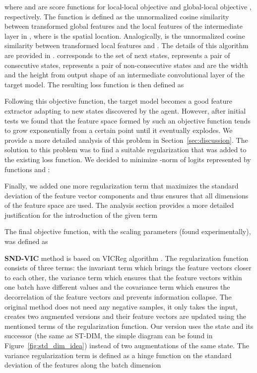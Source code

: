 \documentclass[a4paper,11pt]{elsarticle}
\begin{document}
where  and 
are score functions for local-local objective  and global-local objective , respectively. 
The function  is defined as the unnormalized cosine similarity between transformed global features  and the local features  of the intermediate layer  in , where  is the spatial location. Analogically,  is the unnormalized cosine similarity between transformed local features  and . The details of this algorithm are provided in \cite{Anand2019}.  corresponds to the set of next states,  represents a pair of consecutive states,  represents a pair of non-consecutive states and  are the width and the height from output shape of an intermediate convolutional layer of the target model.
The resulting loss function is then defined as

Following this objective function, the target model becomes a good feature extractor adapting to new states discovered by the agent. However, after initial tests we found that the feature space formed by such an objective function tends to grow exponentially from a certain point until it eventually explodes. We provide a more detailed analysis of this problem in Section~\ref{sec:discussion}. The solution to this problem was to find a suitable regularization that was added to the existing loss function. We decided to minimize -norm of logits represented by functions  and :

Finally, we added one more regularization term  that maximizes the standard deviation  of the feature vector components and thus ensures that all dimensions of the feature space are used. The analysis section provides a more detailed justification for the introduction of the given term


The final objective function, with the scaling parameters  (found experimentally), was defined as


\textbf{SND-VIC} method is based on VICReg algorithm \citep{Bardes2022}. The regularization function consists of three terms: the invariant term which brings the feature vectors closer to each other, the variance term which ensures that the feature vectors within one batch have different values and the covariance term which ensures the decorrelation of the feature vectors and prevents information collapse. The original method does not need any negative samples, it only takes the input, creates two augmented versions and their feature vectors are updated using the mentioned terms of the regularization function. Our version uses the state  and its successor  (the same as ST-DIM, the simple diagram can be found in Figure~\ref{fig:std_dim_idea}) instead of two augmentations of the same state.
The variance regularization term  is defined as a hinge function on the standard deviation of the features along the batch dimension
\end{document}
